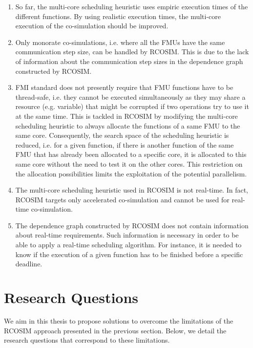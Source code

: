 \begin{enumerate}

\item So far, the multi-core scheduling heuristic uses empiric execution times of the different functions. By using realistic execution times, the multi-core execution of the co-simulation should be improved.

\item Only monorate co-simulations, i.e. where all the FMUs have the same communication step size, can be handled by RCOSIM. This is due to the lack of information about the communication step sizes in the dependence graph constructed by RCOSIM.

\item FMI standard does not presently require that FMU functions have to be thread-safe, i.e. they cannot be executed simultaneously as they may share a resource (e.g. variable) that might be corrupted if two operations try to use it at the same time. This is tackled in RCOSIM by modifying the multi-core scheduling heuristic to always allocate the functions of a same FMU to the same core. Consequently, the search space of the scheduling heuristic is reduced, i.e. for a given function, if there is another function of the same FMU that has already been allocated to a specific core, it is allocated to this same core without the need to test it on the other cores. This restriction on the allocation possibilities limits the exploitation of the potential parallelism.

\item The multi-core scheduling heuristic used in RCOSIM is not real-time. In fact, RCOSIM targets only accelerated co-simulation and cannot be used for real-time co-simulation.

\item The dependence graph constructed by RCOSIM does not contain information about real-time requirements. Such information is necessary in order to be able to apply a real-time scheduling algorithm. For instance, it is needed to know if the execution of a given function has to be finished before a specific deadline.

\end{enumerate} 

\section{Research Questions}

We aim in this thesis to propose solutions to overcome the limitations of the RCOSIM approach presented in the previous section. Below, we detail the research questions that correspond to these limitations.

